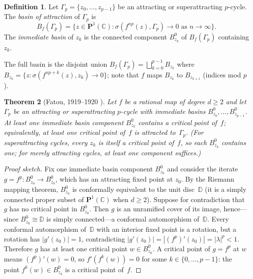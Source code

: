 \documentclass[12pt]{article}
\newtheorem{theorem}{Theorem}[section]
\theoremstyle{definition}
\newtheorem{definition}[theorem]{Definition}
\newcommand{\C}{\mathbb{C}}
\newcommand{\Pone}{\mathbf{P}^1(\C)}
\newcommand{\Bf}{B_f}
\begin{document}
\begin{definition}\label{def:basin}
Let $\Gamma_p=\{z_0,\ldots,z_{p-1}\}$ be an attracting or superattracting
$p$-cycle.  The \emph{basin of attraction} of $\Gamma_p$ is
\begin{equation}\label{eq:basin}
  \Bf(\Gamma_p) = \bigl\{z\in\Pone : \sigma(f^{np}(z),\Gamma_p)\to 0
                           \text{ as }n\to\infty\bigr\}.
\end{equation}
The \emph{immediate basin} of $z_k$ is the connected component $B^0_{z_k}$
of $\Bf(\Gamma_p)$ containing $z_k$.
\end{definition}

The full basin is the disjoint union $\Bf(\Gamma_p)=\bigsqcup_{k=0}^{p-1}
B_{z_k}$ where $B_{z_k}=\{z:\sigma(f^{np+k}(z),z_k)\to 0\}$; note that
$f$ maps $B_{z_k}$ to $B_{z_{k+1}}$ (indices mod $p$).

\begin{theorem}[Fatou, 1919--1920 \cite{Fatou1919,Fatou1920}]
\label{thm:fatou}
Let $f$ be a rational map of degree $d\geq 2$ and let $\Gamma_p$ be an
attracting or superattracting $p$-cycle with immediate basins
$B^0_{z_0},\ldots,B^0_{z_{p-1}}$.  At least one immediate basin component
$B^0_{z_k}$ contains a critical point of~$f$; equivalently, at least one
critical point of~$f$ is attracted to~$\Gamma_p$.  (For superattracting
cycles, every $z_k$ is itself a critical point of~$f$, so each $B^0_{z_k}$
contains one; for merely attracting cycles, at least one component
suffices.)
\end{theorem}

\begin{proof}[Proof sketch]
Fix one immediate basin component $B^0_{z_0}$ and consider the iterate
$g = f^p\colon B^0_{z_0}\to B^0_{z_0}$, which has an attracting fixed
point at $z_0$.  By the Riemann mapping theorem, $B^0_{z_0}$ is
conformally equivalent to the unit disc~$\mathbb{D}$ (it is a simply
connected proper subset of $\Pone$ when $d\geq 2$).  Suppose for
contradiction that $g$ has no critical point in $B^0_{z_0}$.  Then $g$
is an unramified cover of its image, hence---since $B^0_{z_0}\cong\mathbb{D}$
is simply connected---a conformal automorphism of~$\mathbb{D}$.  Every
conformal automorphism of~$\mathbb{D}$ with an interior fixed point is a
rotation, but a rotation has $|g'(z_0)|=1$, contradicting $|g'(z_0)|=
|(f^p)'(z_0)|=|\lambda|^p<1$.  Therefore $g$ has at least one critical
point $w\in B^0_{z_0}$.  A critical point of $g=f^p$ at $w$ means
$(f^p)'(w)=0$, so $f'(f^k(w))=0$ for some $k\in\{0,\ldots,p-1\}$:
the point $f^k(w)\in B^0_{z_k}$ is a critical point of~$f$.
\end{proof}
\end{document}
